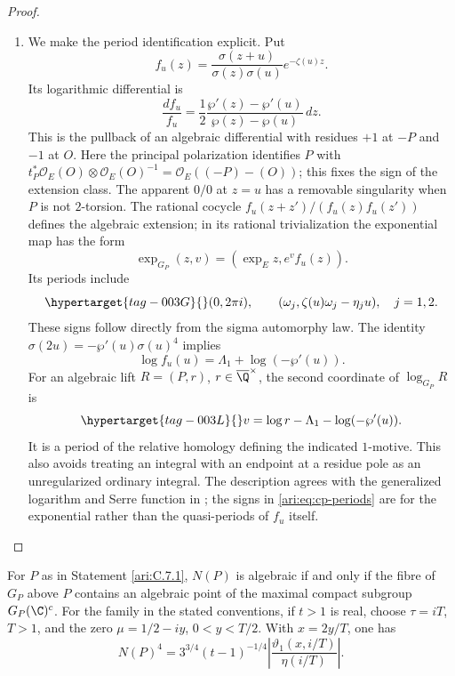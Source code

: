 \begin{proof}
\begin{enumerate}[label=\arabic*.,leftmargin=*]
\item We make the period identification explicit. Put
\[
 f_u(z)=\frac{\sigma(z+u)}{\sigma(z)\sigma(u)}e^{-\zeta(u)z}.
\]
Its logarithmic differential is
\[
 \frac{df_u}{f_u}
 =\frac12\frac{\wp'(z)-\wp'(u)}{\wp(z)-\wp(u)}\,dz.
\]
This is the pullback of an algebraic differential with residues
$+1$ at $-P$ and $-1$ at $O$.
Here the principal polarization identifies $P$ with
$t_P^*\mathcal O_E(O)\otimes\mathcal O_E(O)^{-1}
=\mathcal O_E((-P)-(O))$; this fixes the sign of the extension class. The apparent $0/0$ at $z=u$
has a removable singularity when $P$ is not $2$-torsion.
The rational cocycle $f_u(z+z')/(f_u(z)f_u(z'))$ defines
the algebraic extension; in its rational trivialization the
exponential map has the form
\[
 \exp_{G_P}(z,v)=(\exp_E z,e^v f_u(z)).
\]
Its periods include
\begin{equation}\hypertarget{tag-003G}{}\label{ari:eq:cp-periods}
 (0,2\pi i),\qquad
 (\omega_j,\zeta(u)\omega_j-\eta_j u),\quad j=1,2.
\end{equation}
These signs follow directly from the sigma automorphy law.
The identity
$\sigma(2u)=-\wp'(u)\sigma(u)^4$ implies
\[
 \log f_u(u)=\Lambda_1+\log(-\wp'(u)).
\]
For an algebraic lift $R=(P,r)$, $r\in\overline\Q^{\times}$,
the second coordinate of $\log_{G_P}R$ is
\begin{equation}\hypertarget{tag-003L}{}\label{ari:eq:cp-v}
 v=\log r-\Lambda_1-\log(-\wp'(u)).
\end{equation}
It is a period of the relative homology defining the indicated
$1$-motive. This also avoids treating an integral with an endpoint
at a residue pole as an unregularized ordinary integral.
The description agrees with the generalized logarithm and
Serre function in \citet[Definitions 2.3--2.4 and
Section 6]{bertolin2022}; the signs in
\eqref{ari:eq:cp-periods} are for the exponential rather than the
quasi-periods of $f_u$ itself.
\end{enumerate}
\end{proof}

\begin{proposition}\hypertarget{tag-001B}{}\label{ari:C.7.2}

For $P$ as in Statement \ref{ari:C.7.1}, $N(P)$ is algebraic if and only
if the fibre of $G_P$ above $P$ contains an algebraic point of
the maximal compact subgroup $G_P(\C)^c$.
For the family in the stated conventions, if $t>1$ is real, choose
$\tau=iT$, $T>1$, and the zero $\mu=1/2-iy$, $0<y<T/2$.
With $x=2y/T$, one has
\[
 N(P)^4=3^{3/4}(t-1)^{-1/4}
       \left|\frac{\vartheta_1(x,i/T)}{\eta(i/T)}\right|.
\]
\end{proposition}


